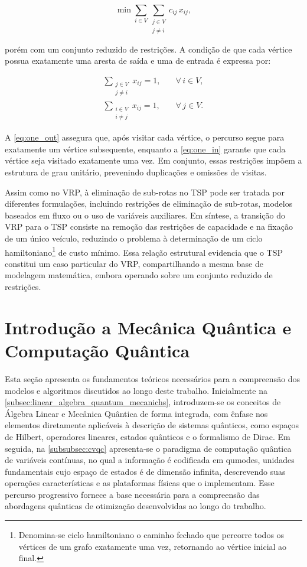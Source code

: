 \begin{equation}
    \min \sum_{i \in V} \sum_{\substack{j \in V \\ j \neq i}} c_{ij}\, x_{ij},
\end{equation}

\noindent porém com um conjunto reduzido de restrições. A condição de que cada vértice possua exatamente uma aresta de saída e uma de entrada é expressa por:

\begin{eqnarray}
\sum_{\substack{j \in V \\ j \neq i}} x_{ij} = 1, & \quad \forall\, i \in V, \label{eq:one_out} \\[4pt]
\sum_{\substack{i \in V \\ i \neq j}} x_{ij} = 1, & \quad \forall\, j \in V. \label{eq:one_in}
\end{eqnarray}

A \autoref{eq:one_out} assegura que, após visitar cada vértice, o percurso segue para exatamente um vértice subsequente, enquanto a \autoref{eq:one_in} garante que cada vértice seja visitado exatamente uma vez. Em conjunto, essas restrições impõem a estrutura de grau unitário, prevenindo duplicações e omissões de visitas.

Assim como no VRP, à eliminação de sub-rotas no TSP pode ser tratada por diferentes formulações, incluindo restrições de eliminação de sub-rotas, modelos baseados em fluxo ou o uso de variáveis auxiliares. Em síntese, a transição do VRP para o TSP consiste na remoção das restrições de capacidade e na fixação de um único veículo, reduzindo o problema à determinação de um ciclo hamiltoniano\footnote{Denomina-se ciclo hamiltoniano o caminho fechado que percorre todos os vértices de um grafo exatamente uma vez, retornando ao vértice inicial ao final.} de custo mínimo. Essa relação estrutural evidencia que o TSP constitui um caso particular do VRP, compartilhando a mesma base de modelagem matemática, embora operando sobre um conjunto reduzido de restrições.

\section{Introdução a Mecânica Quântica e Computação Quântica}

Esta seção apresenta os fundamentos teóricos necessários para a compreensão dos modelos e algoritmos discutidos ao longo deste trabalho. Inicialmente na \autoref{subsec:linear_algebra_quantum_mecanichs}, introduzem-se os conceitos de Álgebra Linear e Mecânica Quântica de forma integrada, com ênfase nos elementos diretamente aplicáveis à descrição de sistemas quânticos, como espaços de Hilbert, operadores lineares, estados quânticos e o formalismo de Dirac. Em seguida, na \autoref{subsubsec:cvqc} apresenta-se o paradigma de computação quântica de variáveis contínuas, no qual a informação é codificada em qumodes, unidades fundamentais cujo espaço de estados é de dimensão infinita, descrevendo suas operações características e as plataformas físicas que o implementam. Esse percurso progressivo fornece a base necessária para a compreensão das abordagens quânticas de otimização desenvolvidas ao longo do trabalho.

